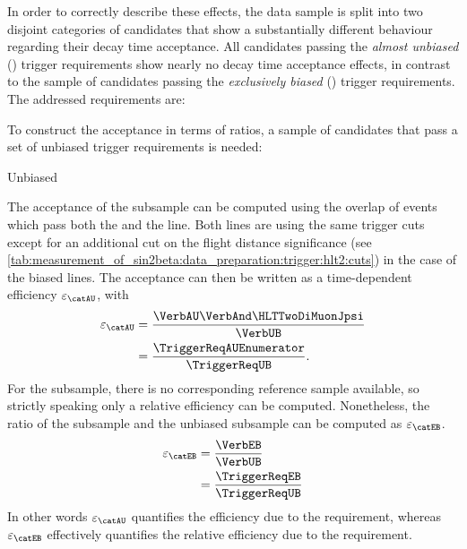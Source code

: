 In order to correctly describe these effects, the data sample is split into two
disjoint categories of candidates that show a substantially different behaviour
regarding their decay time acceptance. All candidates passing the \emph{almost
unbiased} (\textbf{\catAU}) trigger requirements show nearly no decay time
acceptance effects, in contrast to the sample of candidates passing the
\emph{exclusively biased} (\textbf{\catEB}) trigger requirements. The addressed
requirements are:
%
\begin{description}
  \item[\catAU] \TriggerReqAU
  \item[\catEB] \TriggerReqEB
\end{description}
%
To construct the acceptance in terms of ratios, a sample of candidates that pass
a set of unbiased trigger requirements is needed:
%
\begin{description}
  \item[Unbiased] \TriggerReqUB
\end{description}
%
The acceptance of the \catAU subsample can be computed using the overlap of events
which pass both the \HLTTwoDiMuonDetachedJpsi and the
\HLTTwoDiMuonJpsi line. Both lines are using the same trigger cuts except for
an additional cut on the flight distance significance (see
\cref{tab:measurement_of_sin2beta:data_preparation:trigger:hlt2:cuts}) in the
case of the biased lines. The acceptance can then be written as a time-dependent
efficiency $\varepsilon_\text{\catAU}$, with
%
\begin{equation}
  \begin{split}
    \varepsilon_\text{\catAU} &= \frac{\VerbAU \VerbAnd \HLTTwoDiMuonJpsi}{\VerbUB}\\
                              &= \frac{\TriggerReqAUEnumerator}{\TriggerReqUB}.
  \end{split}
\end{equation} 
%
For the \catEB subsample, there is no corresponding reference sample available,
so strictly speaking only a relative efficiency can be computed. Nonetheless,
the ratio of the \catEB subsample and the unbiased subsample can be computed as
$\varepsilon_\text{\catEB}$.
%
\begin{equation}
  \begin{split}
    \varepsilon_\text{\catEB} &= \frac{\VerbEB}{\VerbUB}\\
                              &= \frac{\TriggerReqEB}{\TriggerReqUB}
  \end{split}
\end{equation}
%
In other words $\varepsilon_\text{\catAU}$ quantifies the efficiency due to the
\HLTTwoDiMuonDetachedJpsi requirement, whereas $\varepsilon_\text{\catEB}$
effectively quantifies the relative efficiency due to the \HLTOneTrackMuon
requirement.

